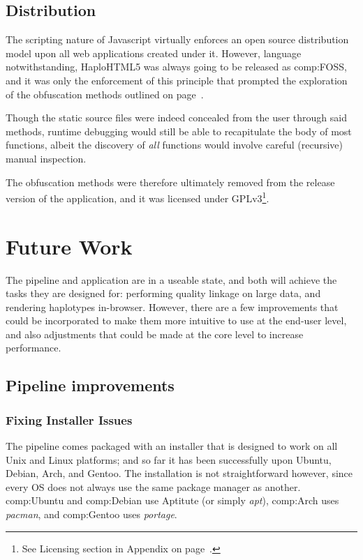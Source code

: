 \subsection{Distribution}

The scripting nature of Javascript virtually enforces an open source distribution model upon all web applications created under it. However, language notwithstanding, HaploHTML5 was always going to be released as \gls{comp:FOSS}, and it was only the enforcement of this principle that prompted the exploration of the obfuscation methods outlined on page~\pageref{ref:haplo:codeobf}.

Though the static source files were indeed concealed from the user through said methods, runtime debugging would still be able to recapitulate the body of most functions, albeit the discovery of \textit{all} functions would involve careful (recursive) manual inspection. 

The obfuscation methods were therefore ultimately removed from the release version of the application, and it was licensed under GPLv3\footnote{See Licensing section in Appendix on page~\pageref{ref:app:licensing}.}.





\section{Future Work}
\enlargethispage{\baselineskip}
The pipeline and application are in a useable state, and both will achieve the tasks they are designed for: performing quality linkage on large data, and rendering haplotypes in-browser. However, there are a few improvements that could be incorporated to make them more intuitive to use at the end-user level, and also adjustments that could be made at the core level to increase performance.

\subsection{Pipeline improvements}

\subsubsection{Fixing Installer Issues}

The pipeline comes packaged with an installer that is designed to work on all Unix and Linux platforms; and so far it has been successfully upon Ubuntu, Debian, Arch, and Gentoo. The installation is not straightforward however, since every OS does not always use the same package manager as another. \gls{comp:Ubuntu} and \gls{comp:Debian} use Aptitute (or simply \textit{apt}), \gls{comp:Arch} uses \textit{pacman}, and \gls{comp:Gentoo} uses \textit{portage}.

